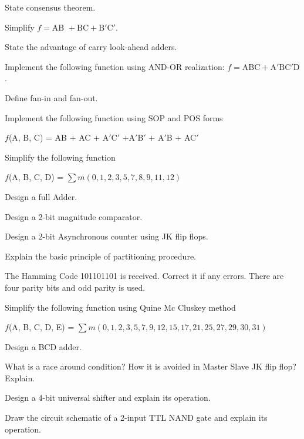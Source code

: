 \markC
\ene

\newpage

\sub{\subj}
\maxtime

\partA

\iitem State consensus theorem.
\item Simplify $f = \text{AB } + \text{BC} + \text{B}'\text{C}'.$
\item State the advantage of carry look-ahead adders.
\item Implement the following function using AND-OR realization:
  $ f = \text{ABC} + \text{A}'\text{BC}'\text{D}$.
\item Define fan-in and fan-out.

\markA
\partB

\item Implement the following function using SOP and POS forms

  $f$(A, B, C) = AB + AC + A$'$C$'$ +A$'$B$'$ + A$'$B  + AC$'$ 
\item Simplify the following function

  $f$(A, B, C, D) = $\sum m (0, 1, 2, 3, 5, 7, 8, 9, 11, 12)$
\item Design a full Adder.
\item Design a 2-bit magnitude comparator.
\item Design a 2-bit Asynchronous counter using JK flip flops.
\item Explain the basic principle of partitioning procedure.

\markB
\partCo

\item \iitem The Hamming Code 101101101 is received. Correct it if any errors. There are four parity bits
  and odd parity is used.

\newpage \again

\Or
\item Simplify the following function using Quine Mc Cluskey method

  $f$(A, B, C, D, E) = $\sum m (0, 1, 2, 3, 5, 7, 9, 12, 15, 17, 21, 25, 27, 29, 30, 31)$
\ene

\item \iitem Design a BCD adder.
\Or
\item What is a race around condition? How it is avoided in Master Slave JK flip flop? Explain.
\ene

\item \iitem Design a 4-bit universal shifter and explain its operation.
\Or
\item Draw the circuit schematic of a 2-input TTL NAND gate and explain its operation.
\ene

